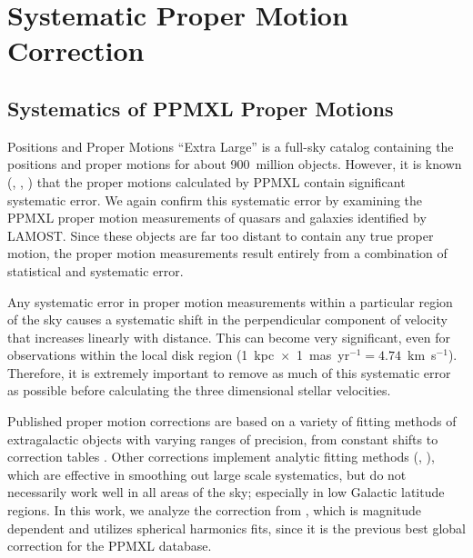 \documentclass[11pt,preprint]{aastex6}
\begin{document}
\section{Systematic Proper Motion Correction}
\subsection{Systematics of PPMXL Proper Motions}

Positions and Proper Motions ``Extra Large'' \citep[PPMXL;][]{Roeser2010} is a full-sky catalog containing the positions and proper motions for about 900~million objects.
However, it is known (\citealt{Wu2011}, \citealt{Grabowski2015}, \citealt{Vickers2016}) that the proper motions calculated by PPMXL contain significant systematic error.
We again confirm this systematic error by examining the PPMXL proper motion measurements of quasars and galaxies identified by LAMOST.  Since these objects are far too distant to contain any true proper motion, the proper motion measurements result entirely from a combination of statistical and systematic error.

Any systematic error in proper motion measurements within a particular region of the sky causes a systematic shift in the perpendicular component of velocity that increases linearly with distance.
This can become very significant, even for observations within the local disk region (1~kpc~$\times$~1~mas~yr$^{-1} = 4.74$~km~s$^{-1}$).
Therefore, it is extremely important to remove as much of this systematic error as possible before calculating the three dimensional stellar velocities.

Published proper motion corrections are based on a variety of fitting methods of extragalactic objects with varying ranges of precision, from constant shifts \citep{Wu2011} to correction tables \citep{Grabowski2015}.
Other corrections implement analytic fitting methods (\citealt{Carlin2013}, \citealt{Vickers2016}), which are effective in smoothing out large scale systematics, but do not necessarily work well in all areas of the sky; especially in low Galactic latitude regions.
In this work, we analyze the correction from \citet{Vickers2016}, which is magnitude dependent and utilizes spherical harmonics fits, since it is the previous best global correction for the PPMXL database.
\end{document}

